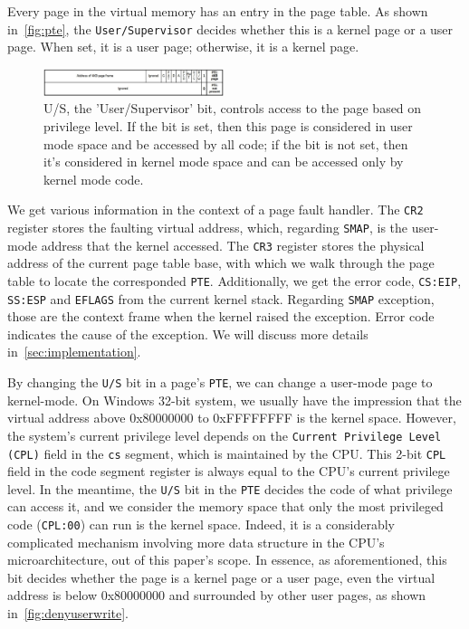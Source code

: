Every page in the virtual memory has an entry in the page table. As shown in~\autoref{fig:pte}, the \texttt{User/Supervisor} decides whether this is a kernel page or a user page. When set, it is a user page; otherwise, it is a kernel page.

\begin{figure}[th]
  \includegraphics[width=0.47\textwidth]{figures/pte2}
  \centering
  \caption{U/S, the 'User/Supervisor' bit, controls access to the page based on privilege level. If the bit is set, then this page is considered in user mode space and be accessed by all code; if the bit is not set, then it's considered in kernel mode space and can be accessed only by kernel mode code. }
  \label{fig:pte}
\end{figure}



We get various information in the context of a page fault handler. The \texttt{CR2} register stores the faulting virtual address, which, regarding \texttt{SMAP}, is the user-mode address that the kernel accessed. The \texttt{CR3} register stores the physical address of the current page table base, with which we walk through the page table to locate the corresponded \texttt{PTE}. Additionally, we get the error code, \texttt{CS:EIP}, \texttt{SS:ESP} and \texttt{EFLAGS} from the  current kernel stack. Regarding \texttt{SMAP} exception, those are the context frame when the kernel raised the exception. Error code indicates the cause of the exception. We will discuss more details in~\autoref{sec:implementation}.



By changing the \texttt{U/S} bit in a page's \texttt{PTE}, we can change a user-mode page to kernel-mode. On Windows 32-bit system, we usually have the impression that the virtual address above 0x80000000 to 0xFFFFFFFF is the kernel space. However, the system's current privilege level depends on the \texttt{Current Privilege Level (CPL)} field in the \texttt{cs} segment, which is maintained by the CPU. This 2-bit \texttt{CPL} field in the code segment register is always equal to the CPU's current privilege level. In the meantime, the \texttt{U/S} bit in the \texttt{PTE} decides the code of what privilege can access it, and we consider the memory space that only the most privileged code (\texttt{CPL:00}) can run is the kernel space. Indeed, it is a considerably complicated mechanism involving more data structure in the CPU's microarchitecture, out of this paper's scope. In essence, as aforementioned, this bit decides whether the page is a kernel page or a user page, even the virtual address is below 0x80000000 and surrounded by other user pages, as shown in~\autoref{fig:denyuserwrite}.

